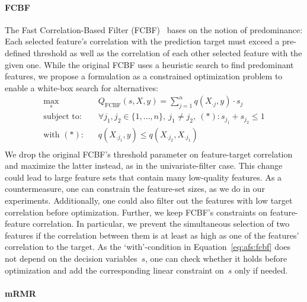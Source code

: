 \documentclass{article}
\theoremstyle{definition}
\begin{document}
\paragraph{FCBF}

The Fast Correlation-Based Filter (FCBF)~\cite{yu2003feature} bases on the notion of predominance:
Each selected feature's correlation with the prediction target must exceed a pre-defined threshold as well as the correlation of each other selected feature with the given one.
While the original FCBF uses a heuristic search to find predominant features, we propose a formulation as a constrained optimization problem to enable a white-box search for alternatives:
%
\begin{equation}
	\begin{aligned}
		\max_s &\quad Q_{\text{FCBF}}(s,X,y) = \sum_{j=1}^{n} q(X_{\cdot{}j},y) \cdot s_j \\
		\text{subject to:} &\quad \forall j_1, j_2 \in \{1, \dots, n\},~j_1 \neq j_2,~(*): s_{j_1} + s_{j_2} \leq 1 \\
		\text{with } (*) \text{:} &\quad q(X_{\cdot{}j_1},y) \leq q(X_{\cdot{}j_2}, X_{\cdot{}j_1}) \\
	\end{aligned}
	\label{eq:afs:fcbf}
\end{equation}
%
We drop the original FCBF's threshold parameter on feature-target correlation and maximize the latter instead, as in the univariate-filter case.
This change could lead to large feature sets that contain many low-quality features.
As a countermeasure, one can constrain the feature-set sizes, as we do in our experiments.
Additionally, one could also filter out the features with low target correlation before optimization.
Further, we keep FCBF's constraints on feature-feature correlation.
In particular, we prevent the simultaneous selection of two features if the correlation between them is at least as high as one of the features' correlation to the target.
As the `with'-condition in Equation~\ref{eq:afs:fcbf} does not depend on the decision variables~$s$, one can check whether it holds before optimization and add the corresponding linear constraint on~$s$ only if needed.

\paragraph{mRMR}
\end{document}
